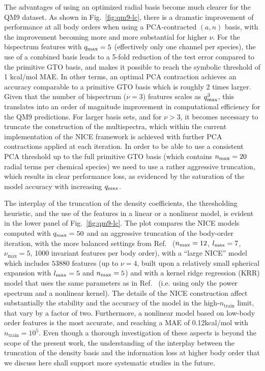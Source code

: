 The advantages of using an optimized radial basis become much clearer for the QM9 dataset.  As shown in Fig.~\ref{fig:qm9-lc}, there is a dramatic improvement of performance at all body orders when using a PCA-contracted $(a,n)$ basis, with the improvement becoming more and more substantial for higher $\nu$. 
For the bispectrum features with $q_\mathrm{max}=5$ (effectively only one channel per species), the use of a combined basis leads to a 5-fold reduction of the test error compared to the primitive GTO basis, and makes it possible to reach the symbolic threshold of 1 kcal/mol MAE.
In other terms, an optimal PCA contraction achieves an accuracy comparable to a primitive GTO basis which is roughly 2 times larger. Given that the number of bispectrum ($\nu=3$) features scales as $q_\mathrm{max}^3$, this translates into an order of magnitude improvement in computational efficiency for the QM9 predictions.
For larger basis sets, and for $\nu>3$, it becomes necessary to truncate the construction of the multispectra, which within the current implementation of the NICE framework is achieved with further PCA contractions applied at each iteration.
In order to be able to use a consistent PCA threshold up to the full primitive GTO basis (which contains $n_\mathrm{max}=20$ radial terms per chemical species) we need to use a rather aggressive truncation, which results in clear performance loss, as evidenced by the saturation of the model accuracy with increasing $q_\mathrm{max}$. 

The interplay of the truncation of the density coefficients, the thresholding heuristic, and the use of the features in a linear or a nonlinear model, is evident in the lower panel of Fig.~\ref{fig:qm9-lc}.
The plot compares the NICE models computed with $q_\mathrm{max}=50$ and an aggressive truncation of the body-order iteration, with the more balanced settings from Ref.~ ($n_\mathrm{max}=12$, $l_\mathrm{max}=7$, $\nu_\text{max}=5$, 1000 invariant features per body order),
with a ``large NICE'' model which includes $53880$ features (up to $\nu=4$, built upon a relatively small spherical expansion  with $l_\mathrm{max} = 5$ and $n_\mathrm{max}=5$) and with a kernel ridge regression (KRR) model that uses the same parameters as in Ref.~ (i.e. using only the power spectrum and a nonlinear kernel).
The details of the NICE construction affect substantially the stability and the accuracy of the model in the high-$n_\text{train}$ limit, that vary by a factor of two.
Furthermore, a nonlinear model based on low-body order features is the most accurate, and reaching a MAE of 0.12kcal/mol with $n_{\text{train}}=10^5$. Even though a thorough investigation of these aspects is beyond the scope of the present work, the understanding of the interplay between the truncation of the density basis and the information loss at higher body order that we discuss here shall support more systematic studies in the future. 

